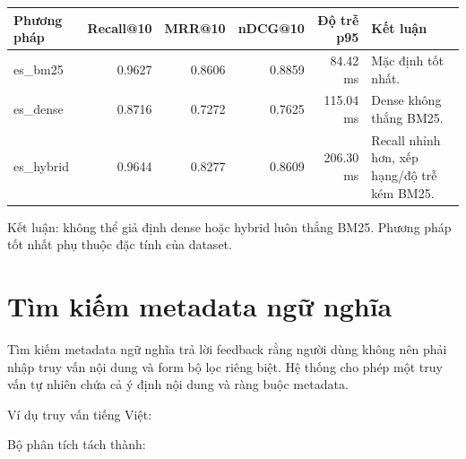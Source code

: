 \documentclass[11pt,a4paper]{article}
\begin{document}
\vspace{0.5em}

\small
\begin{tabularx}{\textwidth}{>{\ttfamily\raggedright\arraybackslash}p{} r r r r Y}
\toprule
Phương pháp & Recall@10 & MRR@10 & nDCG@10 & Độ trễ p95 & Kết luận \\
\midrule
es\_bm25 & 0.9627 & 0.8606 & 0.8859 & 84.42 ms & Mặc định tốt nhất. \\
es\_dense & 0.8716 & 0.7272 & 0.7625 & 115.04 ms & Dense không thắng BM25. \\
es\_hybrid & 0.9644 & 0.8277 & 0.8609 & 206.30 ms & Recall nhỉnh hơn, xếp hạng/độ trễ kém BM25. \\
\bottomrule
\end{tabularx}
\normalsize

Kết luận: không thể giả định dense hoặc hybrid luôn thắng BM25. Phương pháp tốt nhất phụ thuộc đặc tính của dataset.

\section{Tìm kiếm metadata ngữ nghĩa}

Tìm kiếm metadata ngữ nghĩa trả lời feedback rằng người dùng không nên phải nhập truy vấn nội dung và form bộ lọc
riêng biệt. Hệ thống cho phép một truy vấn tự nhiên chứa cả ý định nội dung và ràng buộc metadata.

Ví dụ truy vấn tiếng Việt:

\begin{center}
\end{center}

Bộ phân tích tách thành:

\begin{center}
\end{center}
\end{document}

